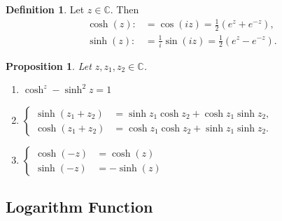 \documentclass[12pt,openany]{book}
\newtheorem{proposition}[theorem]{Proposition}
\theoremstyle{definition}
\newtheorem{definition}{Definition}[chapter]
\newcommand{\C}{\mathbb{C}}
\newcommand{\of}[1]{\left( #1 \right)}
\begin{document}
	\begin{tcolorbox}[colback=white,colframe=defcolor,arc=5pt,title={\color{white}\bf Complex Hyperbolic}]
		\begin{definition}
			Let $z\in\C$. Then \begin{align*}
				\cosh\of{z}:&=\cos(iz)=\frac{1}{2}(e^z+e^{-z}),\\
				\sinh\of{z}:&=\frac{1}{i}\sin(iz)=\frac{1}{2}(e^z-e^{-z}).
			\end{align*}
		\end{definition}
	\end{tcolorbox}
	\vspace{8pt}
	\begin{tcolorbox}[colback=white,colframe=procolor,arc=5pt,title={\color{white}\bf Properties of Complex Hyperbolic}]
		\begin{proposition}
			Let $z,z_1,z_2\in\C$. \begin{enumerate}[(1)]
				\item $\cosh^z-\sinh^2z=1$
				\item $\begin{cases}
					\sinh(z_1+z_2)&=\sinh z_1\cosh z_2+\cosh z_1\sinh z_2,\\
					\cosh(z_1+z_2)&=\cosh z_1\cosh z_2+\sinh z_1\sinh z_2.
				\end{cases}$
				\item $\begin{cases}
					\cosh(-z)&=\cosh(z)\\
					\sinh(-z)&=-\sinh(z)
				\end{cases}$
			\end{enumerate}
		\end{proposition}
	\end{tcolorbox}
	
	\newpage
	\subsection{Logarithm Function}
	
\end{document}
